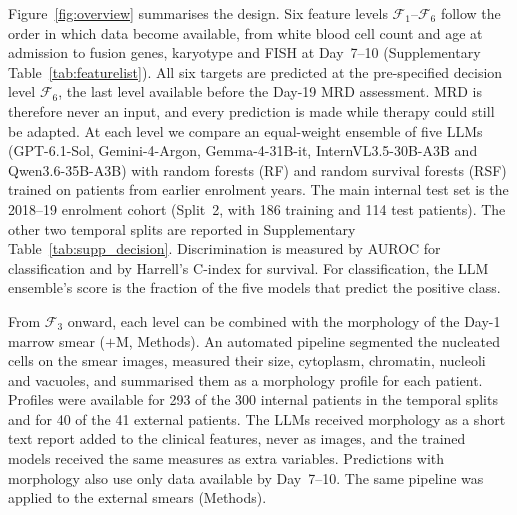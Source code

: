 \documentclass[pdflatex,sn-nature]{sn-jnl}
\begin{document}
Figure~\ref{fig:overview} summarises the design.
Six feature levels $\mathcal{F}_1$--$\mathcal{F}_6$ follow the order
in which data become available, from white blood cell count and age at
admission to fusion genes, karyotype and FISH at Day~7--10
(Supplementary Table~\ref{tab:featurelist}).
All six targets are predicted at the pre-specified decision level
$\mathcal{F}_6$, the last level available before the Day-19 MRD
assessment.
MRD is therefore never an input, and every prediction is made while
therapy could still be adapted.
At each level we compare an equal-weight ensemble of five LLMs
(GPT-6.1-Sol, Gemini-4-Argon, Gemma-4-31B-it, InternVL3.5-30B-A3B and
Qwen3.6-35B-A3B) with random forests (RF) and random survival forests
(RSF) trained on patients from earlier enrolment years.
The main internal test set is the 2018--19 enrolment cohort (Split~2,
with 186 training and 114 test patients).
The other two temporal splits are reported in Supplementary
Table~\ref{tab:supp_decision}.
Discrimination is measured by AUROC for classification and by
Harrell's C-index for survival.
For classification, the LLM ensemble's score is the fraction of the
five models that predict the positive class.

From $\mathcal{F}_3$ onward, each level can be combined with the
morphology of the Day-1 marrow smear ($+$M, Methods).
An automated pipeline segmented the nucleated cells on the smear
images, measured their size, cytoplasm, chromatin, nucleoli and
vacuoles, and summarised them as a morphology profile for each patient.
Profiles were available for 293 of the 300 internal patients in the
temporal splits and for 40 of the 41 external patients.
The LLMs received morphology as a short text report added to the
clinical features, never as images, and the trained models received
the same measures as extra variables.
Predictions with morphology also use only data available by
Day~7--10.
The same pipeline was applied to the external smears (Methods).
\end{document}
